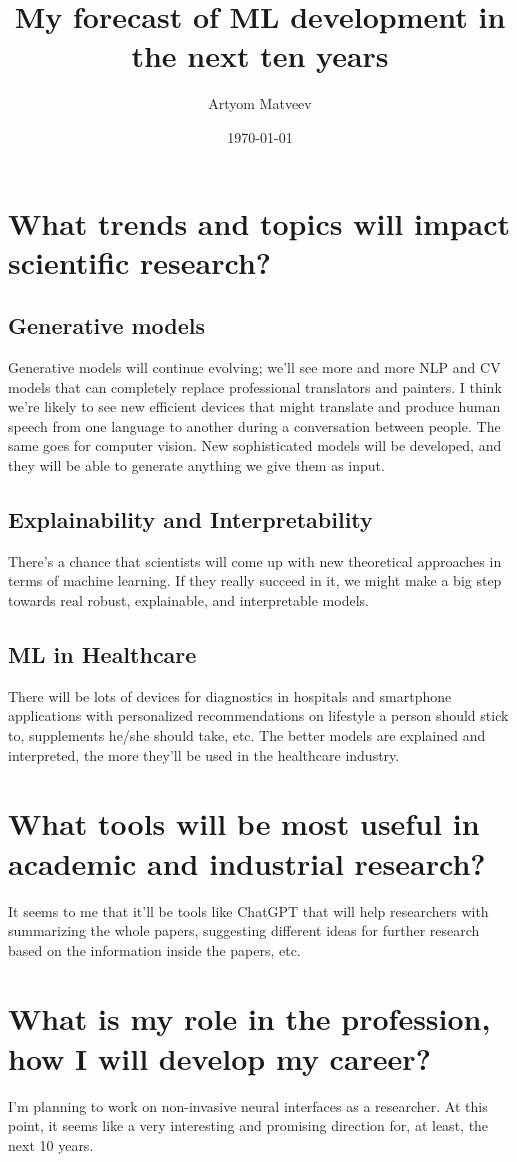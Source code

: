 \documentclass[a4paper]{article}
\title{My forecast of ML development in the next ten years}
\author{Artyom Matveev}
\date{\today}
\begin{document}
\maketitle
\section{What trends and topics will impact scientific research?}
\subsection{Generative models}
Generative models will continue evolving; we'll see more and more NLP and CV models that can completely replace professional translators and painters. I think we're likely to see new efficient devices that might translate and produce human speech from one language to another during a conversation between people. The same goes for computer vision. New sophisticated models will be developed, and they will be able to generate anything we give them as input.

\subsection{Explainability and Interpretability}
There's a chance that scientists will come up with new theoretical approaches in terms of machine learning. If they really succeed in it, we might make a big step towards real robust, explainable, and interpretable models.

\subsection{ML in Healthcare}
There will be lots of devices for diagnostics in hospitals and smartphone applications with personalized recommendations on lifestyle a person should stick to, supplements he/she should take, etc. The better models are explained and interpreted, the more they'll be used in the healthcare industry.

\section{What tools will be most useful in academic and industrial research?}
It seems to me that it'll be tools like ChatGPT that will help researchers with summarizing the whole papers, suggesting different ideas for further research based on the information inside the papers, etc.

\section{What is my role in the profession, how I will develop my career?}
I'm planning to work on non-invasive neural interfaces as a researcher. At this point, it seems like a very interesting and promising direction for, at least, the next 10 years. 
\end{document}
